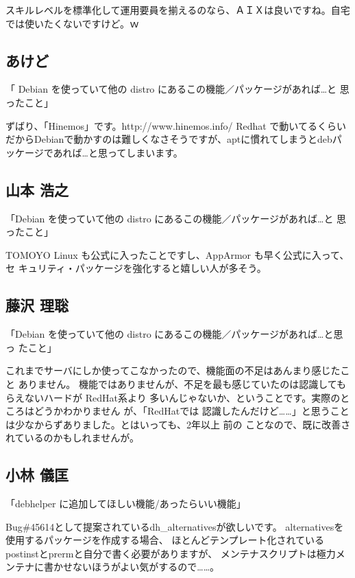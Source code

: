 \documentclass[mingoth,a4paper]{jsarticle}
\begin{document}
スキルレベルを標準化して運用要員を揃えるのなら、ＡＩＸは良いですね。自宅
では使いたくないですけど。ｗ


\subsection{あけど}

「 Debian を使っていて他の distro にあるこの機能／パッケージがあれば…と
思ったこと」

ずばり、「Hinemos」です。http://www.hinemos.info/
Redhat で動いてるくらいだからDebianで動かすのは難しくなさそうですが、aptに慣れてしまうとdebパッケージであれば…と思ってしまいます。

\subsection{山本 浩之}

「Debian を使っていて他の distro にあるこの機能／パッケージがあれば…と
思ったこと」

TOMOYO Linux も公式に入ったことですし、AppArmor も早く公式に入って、セ
キュリティ・パッケージを強化すると嬉しい人が多そう。

\subsection{藤沢 理聡}


「Debian を使っていて他の distro にあるこの機能／パッケージがあれば…と思っ 
たこと」

これまでサーバにしか使ってこなかったので、機能面の不足はあんまり感じたこと 
ありません。
機能ではありませんが、不足を最も感じていたのは認識してもらえないハードが 
RedHat系より
多いんじゃないか、ということです。実際のところはどうかわかりません 
が、「RedHatでは
認識したんだけど……」と思うことは少なからずありました。とはいっても、2年以上 
前の
ことなので、既に改善されているのかもしれませんが。

\subsection{小林 儀匡}

「debhelper に追加してほしい機能/あったらいい機能」

Bug\#45614として提案されているdh\_{}alternativesが欲しいです。
alternativesを使用するパッケージを作成する場合、
ほとんどテンプレート化されているpostinstとprermと自分で書く必要がありますが、
メンテナスクリプトは極力メンテナに書かせないほうがよい気がするので……。
\end{document}
